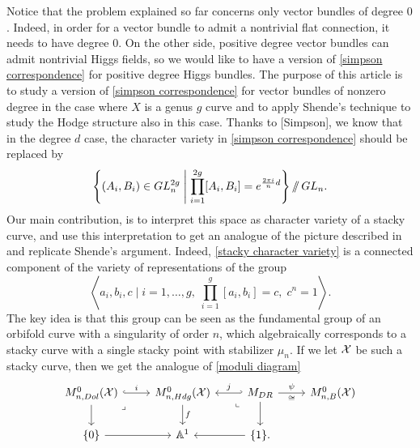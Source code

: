 \documentclass{article}
\begin{document}
Notice that the problem explained so far concerns only vector bundles of degree $0$. Indeed, in order for a vector bundle to admit a nontrivial flat connection, it needs to have degree $0$. On the other side, positive degree vector bundles can admit nontrivial Higgs fields, so we would like to have a version of \eqref{simpson correspondence} for positive degree Higgs bundles.
The purpose of this article is to study a version of \eqref{simpson correspondence} for vector bundles of nonzero degree in the case where $X$ is a genus $g$ curve and to apply Shende's technique to study the Hodge structure also in this case. Thanks to [Simpson], we know that in the degree $d$ case, the character variety in \eqref{simpson correspondence} should be replaced by
\begin{equation}
\left\{ (A_i, B_i) \in GL_n^{2g} \;\middle|\; \prod_{i=1}^{2g}[A_i, B_i]=e^{\frac{2 \pi i}{n} d} \right\} /\!\!/ \, GL_n. \label{stacky character variety}
\end{equation}
Our main contribution, is to interpret this space as character variety of a stacky curve, and use this interpretation to get an analogue of the picture described in  and replicate Shende's argument.
Indeed, \eqref{stacky character variety} is a connected component of the variety of representations of the group
\begin{equation}
\left< a_i, b_i, c \mid i=1,\dots,g, \; \prod_{i=1}^g [a_i, b_i]=c, \; c^n=1 \right>.
\end{equation}
The key idea is that this group can be seen as the fundamental group of an orbifold curve with a singularity of order $n$, which algebraically corresponds to a stacky curve with a single stacky point with stabilizer $\mu_n$. If we let $\mathcal{X}$ be such a stacky curve, then we get the analogue of \eqref{moduli diagram}
\begin{equation}
\begin{tikzcd}
	{M_{n, Dol}^0(\mc{X})} & {M_{n,Hdg}^0(\mc{X})} & {M_{DR}} & {M_{n,B}^0(\mc{X})} \\
	{\{ 0 \}} & {\Ab^1} & {\{ 1 \}.}
	\arrow["i", hook, from=1-1, to=1-2]
	\arrow[from=1-1, to=2-1]
	\arrow["\lrcorner"{anchor=center, pos=0.125}, draw=none, from=1-1, to=2-2]
	\arrow["f", from=1-2, to=2-2]
	\arrow["j"', hook', from=1-3, to=1-2]
	\arrow["\psi", "\cong"', from=1-3, to=1-4]
	\arrow["\lrcorner"{anchor=center, pos=0.125, rotate=-90}, draw=none, from=1-3, to=2-2]
	\arrow[from=1-3, to=2-3]
	\arrow[from=2-1, to=2-2]
	\arrow[from=2-3, to=2-2]
\end{tikzcd} \label{moduli diagram stacky}
\end{equation}
\end{document}
